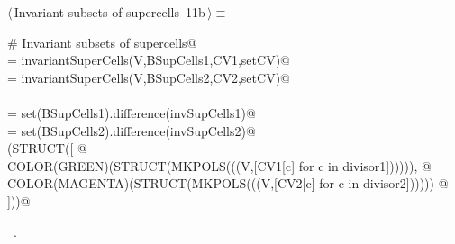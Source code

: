 \documentclass[11pt,oneside]{article}	%
\begin{document}
\begin{flushleft} \small \label{scrap19}
\protect{}$\langle\,$Invariant subsets of supercells\nobreak\ {\footnotesize 11b}$\,\rangle\equiv$
\vspace{-1ex}
\begin{list}{}{} \item
\mbox{}\verb@# Invariant subsets of supercells@\\
\mbox{} = invariantSuperCells(V,BSupCells1,CV1,setCV)@\\
\mbox{} = invariantSuperCells(V,BSupCells2,CV2,setCV)@\\
\mbox{}\verb@@\\
\mbox{} = set(BSupCells1).difference(invSupCells1)@\\
\mbox{} = set(BSupCells2).difference(invSupCells2)@\\
\mbox{}\verb@VIEW(STRUCT([ @\\
\mbox{}\verb@   COLOR(GREEN)(STRUCT(MKPOLS(((V,[CV1[c] for c in divisor1]))))), @\\
\mbox{}\verb@   COLOR(MAGENTA)(STRUCT(MKPOLS(((V,[CV2[c] for c in divisor2]))))) @\\
\mbox{}\verb@]))@\\
\mbox{}\verb@@{\NWsep}
\end{list}
\vspace{-1ex}
\footnotesize\addtolength{\baselineskip}{-1ex}
\begin{list}{}{\setlength{\itemsep}{-\parsep}\setlength{\itemindent}{-\leftmargin}}
\item \NWtxtMacroRefIn\ .
\end{list}
\end{flushleft}
\end{document}
